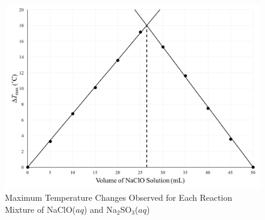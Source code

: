 \begin{figure}[htbp]
\centering
\includegraphics[width=\textwidth]{Bleach_Na2SO3_Variations.png}
\caption{Maximum Temperature Changes Observed for Each Reaction Mixture of NaClO($aq$) and Na$_2$SO$_3$($aq$)}   %
\label{fig:var_Na2SO3}
\end{figure}

